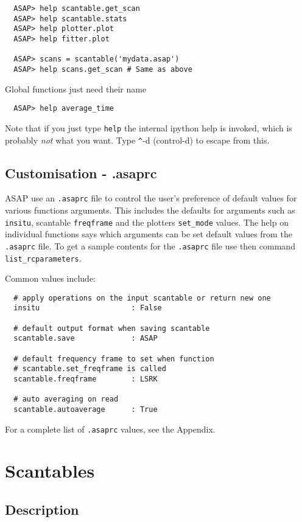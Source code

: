 \documentclass[11pt]{article}
\newcommand{\cmd}[1]{{\tt #1}}
\begin{document}
\begin{verbatim}
  ASAP> help scantable.get_scan
  ASAP> help scantable.stats
  ASAP> help plotter.plot
  ASAP> help fitter.plot

  ASAP> scans = scantable('mydata.asap')
  ASAP> help scans.get_scan # Same as above
\end{verbatim}

Global functions just need their name

\begin{verbatim}
  ASAP> help average_time
\end{verbatim}

Note that if you just type \cmd{help} the internal ipython help is
invoked, which is probably {\em not} what you want. Type \verb+^+-d
(control-d) to escape from this.

\subsection{Customisation - .asaprc}

ASAP use an \cmd{.asaprc} file to control the user's
preference of default values for various functions arguments. This
includes the defaults for arguments such as \cmd{insitu}, scantable
\cmd{freqframe} and the plotters \cmd{set\_mode} values. The help on
individual functions says which arguments can be set default values
from the \cmd{.asaprc} file. To get a sample contents for the
\cmd{.asaprc} file use then command \cmd{list\_rcparameters}.

Common values include:
\begin{verbatim}
  # apply operations on the input scantable or return new one
  insitu                     : False

  # default output format when saving scantable
  scantable.save             : ASAP

  # default frequency frame to set when function
  # scantable.set_freqframe is called
  scantable.freqframe        : LSRK

  # auto averaging on read
  scantable.autoaverage      : True
\end{verbatim}

For a complete list of \cmd{.asaprc} values, see the Appendix.

\section{Scantables}
\subsection {Description}
\end{document}
